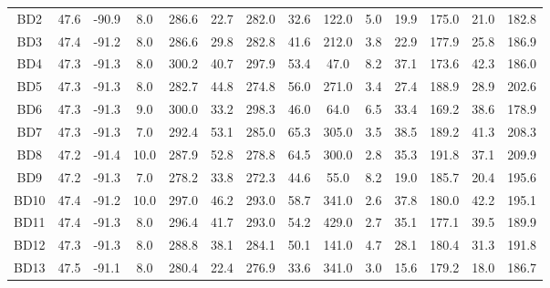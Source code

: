 \begin{table}
\begin{tabular}{cccccccccccccc}
BD2              & 47.6 & -90.9 & 8.0  & 286.6   & 22.7         & 282.0   & 32.6    & 122.0 & 5.0                     & 19.9        & 175.0       & 21.0         & 182.8        \\
BD3              & 47.4 & -91.2 & 8.0  & 286.6   & 29.8         & 282.8   & 41.6    & 212.0 & 3.8                     & 22.9        & 177.9       & 25.8         & 186.9        \\
BD4              & 47.3 & -91.3 & 8.0  & 300.2   & 40.7         & 297.9   & 53.4    & 47.0  & 8.2                     & 37.1        & 173.6       & 42.3         & 186.0        \\
BD5              & 47.3 & -91.3 & 8.0  & 282.7   & 44.8         & 274.8   & 56.0    & 271.0 & 3.4                     & 27.4        & 188.9       & 28.9         & 202.6        \\
BD6              & 47.3 & -91.3 & 9.0  & 300.0   & 33.2         & 298.3   & 46.0    & 64.0  & 6.5                     & 33.4        & 169.2       & 38.6         & 178.9        \\
BD7              & 47.3 & -91.3 & 7.0  & 292.4   & 53.1         & 285.0   & 65.3    & 305.0 & 3.5                     & 38.5        & 189.2       & 41.3         & 208.3        \\
BD8              & 47.2 & -91.4 & 10.0 & 287.9   & 52.8         & 278.8   & 64.5    & 300.0 & 2.8                     & 35.3        & 191.8       & 37.1         & 209.9        \\
BD9              & 47.2 & -91.3 & 7.0  & 278.2   & 33.8         & 272.3   & 44.6    & 55.0  & 8.2                     & 19.0        & 185.7       & 20.4         & 195.6        \\
BD10             & 47.4 & -91.2 & 10.0 & 297.0   & 46.2         & 293.0   & 58.7    & 341.0 & 2.6                     & 37.8        & 180.0       & 42.2         & 195.1        \\
BD11             & 47.4 & -91.3 & 8.0  & 296.4   & 41.7         & 293.0   & 54.2    & 429.0 & 2.7                     & 35.1        & 177.1       & 39.5         & 189.9        \\
BD12             & 47.3 & -91.3 & 8.0  & 288.8   & 38.1         & 284.1   & 50.1    & 141.0 & 4.7                     & 28.1        & 180.4       & 31.3         & 191.8        \\
BD13             & 47.5 & -91.1 & 8.0  & 280.4   & 22.4         & 276.9   & 33.6    & 341.0 & 3.0                     & 15.6        & 179.2       & 18.0         & 186.7        \\

\end{tabular}
\end{table}
